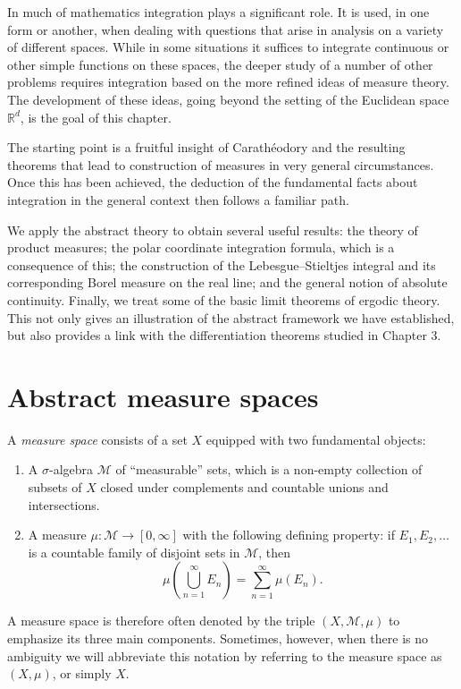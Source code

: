 \documentclass[11pt,openany]{book}
\begin{document}
In much of mathematics integration plays a significant role. It is used, in one form or another, when dealing with questions that arise in analysis on a variety of different spaces. While in some situations it suffices to integrate continuous or other simple functions on these spaces, the deeper study of a number of other problems requires integration based on the more refined ideas of measure theory. The development of these ideas, going beyond the setting of the Euclidean space $\mathbb R^d$, is the goal of this chapter.

The starting point is a fruitful insight of Carath\'eodory and the resulting theorems that lead to construction of measures in very general circumstances. Once this has been achieved, the deduction of the fundamental facts about integration in the general context then follows a familiar path.

We apply the abstract theory to obtain several useful results: the theory of product measures; the polar coordinate integration formula, which is a consequence of this; the construction of the Lebesgue--Stieltjes integral and its corresponding Borel measure on the real line; and the general notion of absolute continuity. Finally, we treat some of the basic limit theorems of ergodic theory. This not only gives an illustration of the abstract framework we have established, but also provides a link with the differentiation theorems studied in Chapter 3.

\section{Abstract measure spaces}

A \emph{measure space} consists of a set $X$ equipped with two fundamental objects:
\begin{enumerate}
\item[(I)] A $\sigma$-algebra $\mathcal M$ of ``measurable'' sets, which is a non-empty collection of subsets of $X$ closed under complements and countable unions and intersections.
\item[(II)] A measure $\mu:\mathcal M\to[0,\infty]$ with the following defining property: if $E_1,E_2,\ldots$ is a countable family of disjoint sets in $\mathcal M$, then
\[
\mu\left(\bigcup_{n=1}^{\infty}E_n\right)=\sum_{n=1}^{\infty}\mu(E_n).
\]
\end{enumerate}
A measure space is therefore often denoted by the triple $(X,\mathcal M,\mu)$ to emphasize its three main components. Sometimes, however, when there is no ambiguity we will abbreviate this notation by referring to the measure space as $(X,\mu)$, or simply $X$.
\end{document}
